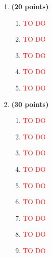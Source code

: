 \documentclass[a4paper]{article}
\newcommand{\TODO}{\textcolor{red}{TO DO}}
\begin{document}
\begin{enumerate}
\item \textbf{(20 points)} 
    \begin{enumerate}
    \item \TODO
    \item \TODO
    \item \TODO
    \item \TODO
    \item \TODO
    \end{enumerate}

\item \textbf{(30 points)} 
    \begin{enumerate}
    \item \TODO
    \item \TODO
    \item \TODO
    \item \TODO
    \item \TODO
    \item \TODO
    \item \TODO
    \item \TODO
    \item \TODO
    \end{enumerate} 

\end{enumerate}
\end{document}
